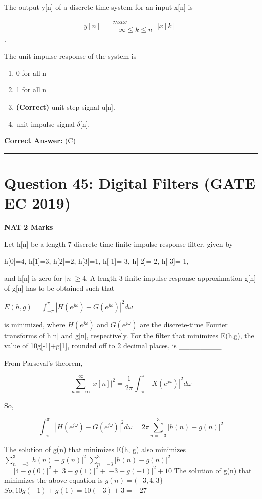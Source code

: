 \documentclass[11pt,a4paper]{article}
\begin{document}
\noindent The output y[n] of a discrete-time system for an input x[n] is 

\[
y[n]=\begin{matrix} max\\ -\infty \leq k\leq n \end{matrix}\; |x[k]|
\]
.

The unit impulse response of the system is


\begin{enumerate}[label=(\Alph*)]
    \item 0 for all n
    \item 1 for all n
    \item \textbf{(Correct)} unit step signal u[n].
    \item unit impulse signal $\delta$[n].
\end{enumerate}

\noindent \textbf{Correct Answer:} (C)


\vspace{1.5em}
\hrule
\vspace{1.5em}

\section*{Question 45: Digital Filters (GATE EC 2019)}
\noindent \textbf{\color{primary}NAT} \hfill \textbf{\color{secondary}2 Marks}


\noindent Let h[n] be a length-7 discrete-time finite impulse response filter, given by 

 h[0]=4, h[1]=3,  h[2]=2,  h[3]=1,  
h[-1]=-3,  h[-2]=-2,  h[-3]=-1,

 and h[n] is zero for $|n|\geq 4$. A length-3 finite impulse response approximation g[n] of g[n] has to be obtained such that

$E(h,g)=\int_{-\pi}^{\pi}|H(e^{j\omega })-G(e^{j\omega })|^2d\omega$

 is minimized, where  $H(e^{j\omega })$ and $G(e^{j\omega })$ are the discrete-time Fourier transforms of h[n] and g[n], respectively. For the filter that minimizes E(h,g), the value of 10g[-1]+g[1], rounded off to 2 decimal places, is \_\_\_\_\_\_\_\_


\begin{tcolorbox}[solbox, title=Detailed Solution -- Question 45]
From Parseval's theorem,

\[
\sum_{n=-\infty}^{\infty}|x[n]|^{2}=\frac{1}{2 \pi} \int_{-\pi}^{\pi}\left|X\left(e^{j \omega}\right)\right|^{2} d \omega
\]

 So,

\[
\int_{-\pi}^{\pi}\left|H\left(e^{j \omega}\right)-G\left(e^{j \omega}\right)\right|^{2} d \omega=2 \pi \sum_{n=-3}^{3}|h(n)-g(n)|^{2}
\]

 The solution of g(n) that minimizes E(h, g) also 
 minimizes $\sum_{n=-3}^{3}|h(n)-g(n)|^{2}$
$\sum_{n=-3}^{3}|h(n)-g(n)|^{2}$
$=|4-g(0)|^{2}+|3-g(1)|^{2}+|-3-g(-1)|^{2}+10$
 The solution of g(n) that minimizes the above 
 equation is
$g(n)=(-3,4,3\}$
$So, 10 g(-1)+g(1)=10(-3)+3=-27$
\end{tcolorbox}
\end{document}
